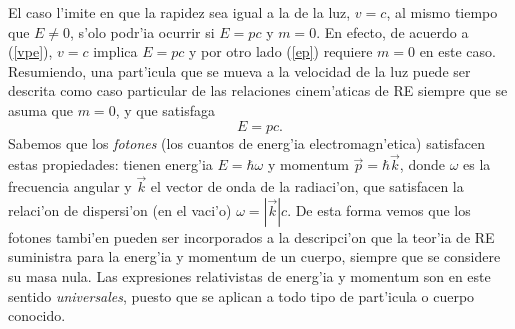 El caso l'imite en que la rapidez sea igual a la de la luz, $v=c$, al mismo tiempo que $E\neq 0$, s'olo podr'ia ocurrir si $E=pc$ y $m=0$. En efecto, de acuerdo a (\ref{vpe}), $v=c$ implica $E=pc$ y por otro lado (\ref{ep}) requiere $m=0$ en este caso. Resumiendo, una part'icula que se mueva a la velocidad de la luz puede ser descrita como caso particular de las relaciones cinem'aticas de RE siempre que se asuma que $m=0$, y que satisfaga
\begin{equation}
E=pc.
\end{equation}
Sabemos que los \textit{fotones} (los cuantos de energ'ia electromagn'etica) satisfacen estas propiedades: tienen energ'ia $E=\hbar\omega$ y momentum $\vec{p}=\hbar\vec{k}$, donde $\omega$ es la frecuencia angular y $\vec{k}$ el vector de onda de la radiaci'on, que satisfacen la relaci'on de dispersi'on (en el vaci'o) $\omega=|\vec{k}|c$. De esta forma vemos que los fotones tambi'en pueden ser incorporados a la descripci'on que la teor'ia de RE suministra para la energ'ia y momentum de un cuerpo, siempre que se considere su masa nula. Las expresiones relativistas de energ'ia y momentum son en este sentido \textit{universales}, puesto que se aplican a todo tipo de part'icula o cuerpo conocido.



